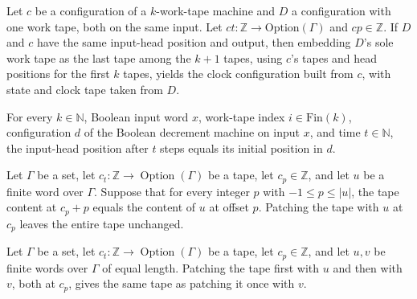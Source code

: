 \begin{theorem}
\label{Turing.sc_lastLayout}
\leanok
{}
Let $c$ be a configuration of a $k$-work-tape machine and $D$ a configuration with one
work tape, both on the same input. Let $ct:\mathbb Z\to\mathrm{Option}(\Gamma)$ and
$cp\in\mathbb Z$. If $D$ and $c$ have the same input-head position and output, then
embedding $D$'s sole work tape as the last tape among the $k+1$ tapes, using $c$'s tapes
and head positions for the first $k$ tapes, yields the clock configuration built from
$c$, with state and clock tape taken from $D$.
\end{theorem}

\begin{theorem}
\label{Turing.sc_dec_inputPos}
\leanok
{}
For every $k\in\mathbb{N}$, Boolean input word $x$, work-tape index
$i\in\mathrm{Fin}(k)$, configuration $d$ of the Boolean decrement machine on input $x$,
and time $t\in\mathbb{N}$, the input-head position after $t$ steps equals its initial
position in $d$.
\end{theorem}

\begin{theorem}
\label{Turing.sc_wordPatch_self}
\leanok
{}
Let $\Gamma$ be a set, let $c_t:\mathbb{Z}\to\operatorname{Option}(\Gamma)$ be a tape,
let $c_p\in\mathbb{Z}$, and let $u$ be a finite word over $\Gamma$. Suppose that for
every integer $p$ with $-1\le p\le |u|$, the tape content at $c_p+p$ equals the content
of $u$ at offset $p$. Patching the tape with $u$ at $c_p$ leaves the entire tape
unchanged.
\end{theorem}

\begin{theorem}
\label{Turing.sc_wordPatch_twice}
\leanok
{}
Let $\Gamma$ be a set, let $c_t:\mathbb{Z}\to\operatorname{Option}(\Gamma)$ be a tape,
let $c_p\in\mathbb{Z}$, and let $u,v$ be finite words over $\Gamma$ of equal length.
Patching the tape first with $u$ and then with $v$, both at $c_p$, gives the same tape
as patching it once with $v$.
\end{theorem}

